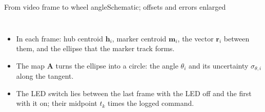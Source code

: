 %
\begin{frame}{From video frame to wheel angle}{Schematic; offsets and errors enlarged}
  \label{app:wheel-angle}
  \scriptsize
  \begin{columns}[T]
  \centering
  \resizebox{\linewidth}{!}{}
  \begin{itemize}\setlength{\itemsep}{1pt}
    \item[(a)] In each frame: hub centroid $\mathbf h_i$, marker centroid $\mathbf m_i$, the vector $\mathbf r_i$ between them, and the ellipse that the marker track forms.
    \item[(b)] The map $\mathbf A$ turns the ellipse into a circle: the angle $\theta_i$ and its uncertainty $\sigma_{\theta,i}$ along the tangent.
    \item[(c)] The LED switch lies between the last frame with the LED off and the first with it on; their midpoint $t_k$ times the logged command.
  \end{itemize}
  \end{columns}
\end{frame}

